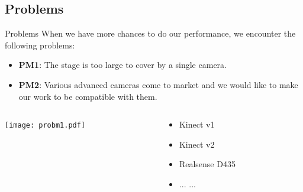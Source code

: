 \documentclass{beamer}
\begin{document}
\subsection{Problems}
\begin{frame}{Problems}
	When we have more chances to do our performance, we encounter the following 
	problems:
	\begin{itemize}
	    \item \textbf{PM1}: The stage is too large to cover by a single camera.
	    \item \textbf{PM2}: Various advanced cameras come to market and we 
	          would like to make our work to be compatible with them.
	\end{itemize}
	\begin{columns}
	    \begin{column}{0.6\textwidth}  %
	        \begin{center}
	            \texttt{[image: probm1.pdf]}
	        \end{center}
	    \end{column}
	    \begin{column}{0.4\textwidth}
		    \begin{itemize}
		        \item Kinect v1
		        \item Kinect v2
		        \item Realsense D435
		        \item ... ...
		    \end{itemize}
		\end{column}
	\end{columns}
\end{frame}
\end{document}
